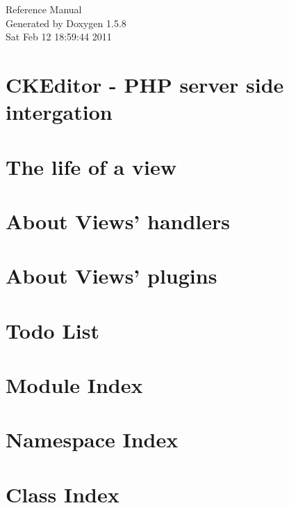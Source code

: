 \documentclass[a4paper]{book}
\begin{document}
\begin{titlepage}
\vspace*{7cm}
\begin{center}
{\Large Reference Manual}\\
\vspace*{1cm}
{\large Generated by Doxygen 1.5.8}\\
\vspace*{0.5cm}
{\small Sat Feb 12 18:59:44 2011}\\
\end{center}
\end{titlepage}
\clearemptydoublepage
{}
\tableofcontents
\clearemptydoublepage
{}
\chapter{CKEditor - PHP server side intergation}
\label{index}\hypertarget{index}{}
\chapter{The life of a view}
\label{view_lifetime}
\hypertarget{view_lifetime}{}

\chapter{About Views' handlers}
\label{views_handlers}
\hypertarget{views_handlers}{}

\chapter{About Views' plugins}
\label{views_plugins}
\hypertarget{views_plugins}{}

\chapter{Todo List}
\label{todo}
\hypertarget{todo}{}

\chapter{Module Index}

\chapter{Namespace Index}

\chapter{Class Index}

\end{document}

